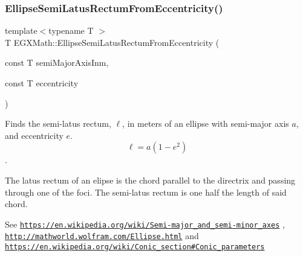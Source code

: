 \subsubsection{\texorpdfstring{Ellipse\+Semi\+Latus\+Rectum\+From\+Eccentricity()}{EllipseSemiLatusRectumFromEccentricity()}}
{\footnotesize\ttfamily template$<$typename T $>$ \\
T E\+G\+X\+Math\+::\+Ellipse\+Semi\+Latus\+Rectum\+From\+Eccentricity (\begin{DoxyParamCaption}\item[{const T}]{semi\+Major\+Axis\+Inm,  }\item[{const T}]{eccentricity }\end{DoxyParamCaption})}



Finds the semi-\/latus rectum, $\ell$, in meters of an ellipse with semi-\/major axis $a$, and eccentricity $e$. \[ \ell=a(1-e^2) \]. 

The latus rectum of an elipse is the chord parallel to the directrix and passing through one of the foci. The semi-\/latus rectum is one half the length of said chord.

See \href{https://en.wikipedia.org/wiki/Semi-major_and_semi-minor_axes}{\tt https\+://en.\+wikipedia.\+org/wiki/\+Semi-\/major\+\_\+and\+\_\+semi-\/minor\+\_\+axes} , \href{http://mathworld.wolfram.com/Ellipse.html}{\tt http\+://mathworld.\+wolfram.\+com/\+Ellipse.\+html} and \href{https://en.wikipedia.org/wiki/Conic_section#Conic_parameters}{\tt https\+://en.\+wikipedia.\+org/wiki/\+Conic\+\_\+section\#\+Conic\+\_\+parameters}


